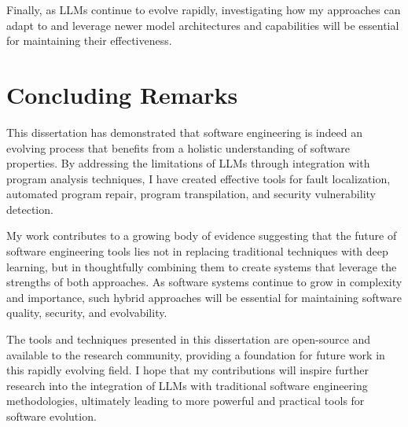 Finally, as LLMs continue to evolve rapidly, investigating how my approaches can adapt to and leverage newer model architectures and capabilities will be essential for maintaining their effectiveness.

\section{Concluding Remarks}

This dissertation has demonstrated that software engineering is indeed an evolving process that benefits from a holistic understanding of software properties. By addressing the limitations of LLMs through integration with program analysis techniques, I have created effective tools for fault localization, automated program repair, program transpilation, and security vulnerability detection.

My work contributes to a growing body of evidence suggesting that the future of software engineering tools lies not in replacing traditional techniques with deep learning, but in thoughtfully combining them to create systems that leverage the strengths of both approaches. As software systems continue to grow in complexity and importance, such hybrid approaches will be essential for maintaining software quality, security, and evolvability.

The tools and techniques presented in this dissertation are open-source and available to the research community, providing a foundation for future work in this rapidly evolving field. I hope that my contributions will inspire further research into the integration of LLMs with traditional software engineering methodologies, ultimately leading to more powerful and practical tools for software evolution.
